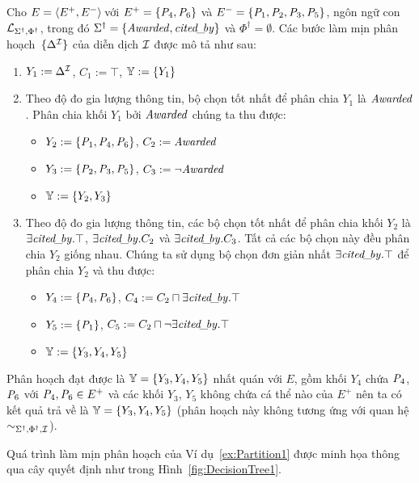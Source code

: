 \begin{Example}
Cho $E = \left\langle E^+, E^-\right\rangle\!$ với $E^+ = \{\mathit{P}_4, \mathit{P}_6\}$ và $E^- = \{\mathit{P}_1, \mathit{P}_2, \mathit{P}_3, \mathit{P}_5\}$, ngôn ngữ con $\mathcal{L}_{\Sigma^\dag,\Phi^\dag}$, trong đó $\Sigma^\dag = \{\mathit{Awarded}, \mathit{cited\!\_\!by}\}$ và  $\Phi^\dag = \emptyset$. Các bước làm mịn phân hoạch~$\{\Delta^{\mathcal{I}}\}$ của diễn dịch $\mathcal{I}$ được mô tả như sau:
\begin{enumerate}
	\item $Y_1 := \Delta^{\mathcal{I}}$, $C_1 := \top$, $\mathbb{Y} := \{Y_1\}$
	\item Theo độ đo gia lượng thông tin, bộ chọn tốt nhất để phân chia $Y_1$ là $\mathit{Awarded}$. Phân chia khối $Y_1$ bởi $\mathit{Awarded}$ chúng ta thu được:
	\begin{itemize}
		\item $Y_2 := \{\mathit{P}_1, \mathit{P}_4, \mathit{P}_6\}$, $C_2 := \mathit{Awarded}$
		\item $Y_3 := \{\mathit{P}_2, \mathit{P}_3, \mathit{P}_5\}$, $C_3 := \neg\mathit{Awarded}$
		\item $\mathbb{Y} := \{Y_2, Y_3\}$
	\end{itemize}
	\item Theo độ đo gia lượng thông tin, các bộ chọn tốt nhất để phân chia khối $Y_2$ là $\exists\mathit{cited\!\_\!by}.\top$, $\exists\mathit{cited\!\_\!by}.C_2$ và $\exists\mathit{cited\!\_\!by}.C_3$. Tất cả các bộ chọn này đều phân chia $Y_2$ giống nhau. Chúng ta sử dụng bộ chọn đơn giản nhất $\exists\mathit{cited\!\_\!by}.\top$ để phân chia $Y_2$ và thu được:
	\begin{itemize}
		\item $Y_4 := \{\mathit{P}_4, \mathit{P}_6\}$, $C_4 := C_2 \sqcap \exists\mathit{cited\!\_\!by}.\top$
		\item $Y_5 := \{\mathit{P}_1\}$, $C_5 := C_2 \sqcap \neg\exists\mathit{cited\!\_\!by}.\top$
		\item $\mathbb{Y} := \{Y_3, Y_4, Y_5\}$
	\end{itemize}
\end{enumerate}

Phân hoạch đạt được là $\mathbb{Y} = \{Y_3, Y_4, Y_5\}$ nhất quán với $E$, gồm khối $Y_4$ chứa $\mathit{P}_4$, $\mathit{P}_6$ với $\mathit{P}_4, \mathit{P}_6 \in E^+$ và các khối $Y_3$, $Y_5$ không chứa cá thể nào của $E^+$ nên ta có kết quả trả về là \mbox{$\mathbb{Y} = \{Y_3, Y_4, Y_5\}$}
(phân hoạch này không tương ứng với quan hệ $\sim_{\Sigma^\dag,\Phi^\dag,\mathcal{I}}$).\myend
\end{Example}

Quá trình làm mịn phân hoạch của Ví dụ~\ref{ex:Partition1} được minh họa thông qua cây quyết định như trong Hình~\ref{fig:DecisionTree1}.

